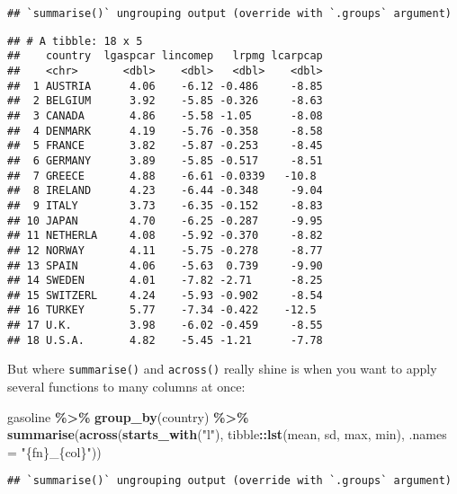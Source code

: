 \documentclass[
]{article}
\newenvironment{Shaded}{\begin{snugshade}}{\end{snugshade}}
\newcommand{\DataTypeTok}[1]{\textcolor[rgb]{0.13,0.29,0.53}{#1}}
\newcommand{\KeywordTok}[1]{\textcolor[rgb]{0.13,0.29,0.53}{\textbf{#1}}}
\newcommand{\NormalTok}[1]{#1}
\newcommand{\OperatorTok}[1]{\textcolor[rgb]{0.81,0.36,0.00}{\textbf{#1}}}
\newcommand{\StringTok}[1]{\textcolor[rgb]{0.31,0.60,0.02}{#1}}
\begin{document}
\begin{verbatim}
## `summarise()` ungrouping output (override with `.groups` argument)
\end{verbatim}

\begin{verbatim}
## # A tibble: 18 x 5
##    country  lgaspcar lincomep   lrpmg lcarpcap
##    <chr>       <dbl>    <dbl>   <dbl>    <dbl>
##  1 AUSTRIA      4.06    -6.12 -0.486     -8.85
##  2 BELGIUM      3.92    -5.85 -0.326     -8.63
##  3 CANADA       4.86    -5.58 -1.05      -8.08
##  4 DENMARK      4.19    -5.76 -0.358     -8.58
##  5 FRANCE       3.82    -5.87 -0.253     -8.45
##  6 GERMANY      3.89    -5.85 -0.517     -8.51
##  7 GREECE       4.88    -6.61 -0.0339   -10.8 
##  8 IRELAND      4.23    -6.44 -0.348     -9.04
##  9 ITALY        3.73    -6.35 -0.152     -8.83
## 10 JAPAN        4.70    -6.25 -0.287     -9.95
## 11 NETHERLA     4.08    -5.92 -0.370     -8.82
## 12 NORWAY       4.11    -5.75 -0.278     -8.77
## 13 SPAIN        4.06    -5.63  0.739     -9.90
## 14 SWEDEN       4.01    -7.82 -2.71      -8.25
## 15 SWITZERL     4.24    -5.93 -0.902     -8.54
## 16 TURKEY       5.77    -7.34 -0.422    -12.5 
## 17 U.K.         3.98    -6.02 -0.459     -8.55
## 18 U.S.A.       4.82    -5.45 -1.21      -7.78
\end{verbatim}

But where \texttt{summarise()} and \texttt{across()} really shine is when you want to apply several functions
to many columns at once:

\begin{Shaded}
\begin{Highlighting}[]
\NormalTok{gasoline }\OperatorTok{\%\textgreater{}\%}
\StringTok{  }\KeywordTok{group\_by}\NormalTok{(country) }\OperatorTok{\%\textgreater{}\%}
\StringTok{  }\KeywordTok{summarise}\NormalTok{(}\KeywordTok{across}\NormalTok{(}\KeywordTok{starts\_with}\NormalTok{(}\StringTok{"l"}\NormalTok{), tibble}\OperatorTok{::}\KeywordTok{lst}\NormalTok{(mean, sd, max, min), }\DataTypeTok{.names =} \StringTok{"\{fn\}\_\{col\}"}\NormalTok{))}
\end{Highlighting}
\end{Shaded}

\begin{verbatim}
## `summarise()` ungrouping output (override with `.groups` argument)
\end{verbatim}
\end{document}
